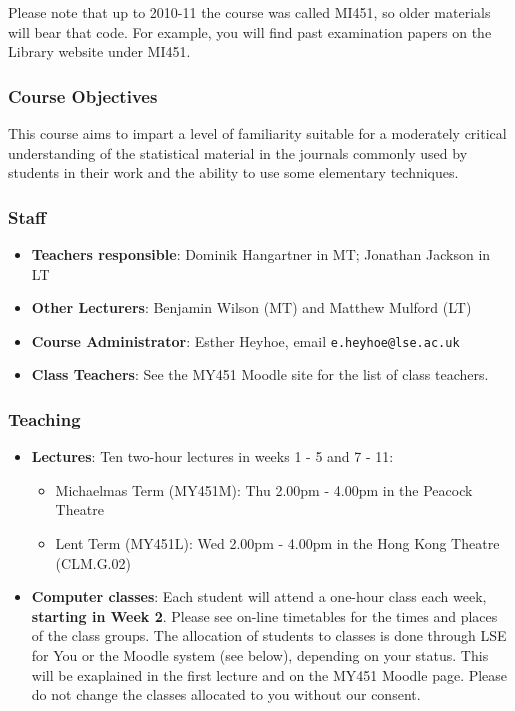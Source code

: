 Please note that up to 2010-11 the course was called MI451, so older
materials will bear that code. For example, you will find past
examination papers on the Library website under MI451.

\subsubsection{Course Objectives}
This course aims to impart a level of familiarity suitable for a
moderately critical understanding of the statistical material in the
journals commonly used by students in their work and the ability to use
some elementary techniques.


\subsubsection{Staff}
\begin{itemize}
\item
\textbf{Teachers responsible}: Dominik Hangartner in MT;
Jonathan Jackson in LT
\item
\textbf{Other Lecturers}:  Benjamin Wilson (MT) and Matthew Mulford (LT)
\item
\textbf{Course Administrator}: Esther Heyhoe, email
\texttt{e.heyhoe@lse.ac.uk}
\item
\textbf{Class Teachers}:
See the MY451 Moodle site for the list of class teachers.
\end{itemize}

\newpage
\subsubsection{Teaching}
\begin{itemize}
\item
\textbf{Lectures}:
Ten two-hour lectures in weeks 1 - 5 and 7 - 11:
\begin{itemize}
\item
Michaelmas Term (MY451M): Thu 2.00pm - 4.00pm in the Peacock Theatre
\item
Lent Term (MY451L): Wed 2.00pm - 4.00pm in the Hong Kong Theatre
(CLM.G.02)
\end{itemize}
\item
\textbf{Computer classes}:
Each student will attend a one-hour class each week,
\textbf{starting in Week 2}. Please see on-line timetables for the times
and places of the class groups.
The allocation of students to classes is done through
LSE for You or the Moodle system (see below), depending on your status. This will be
exaplained in the first lecture and on the MY451 Moodle page.
Please do not change the classes allocated to you without our consent.
\end{itemize}


